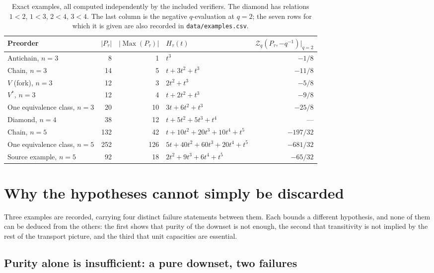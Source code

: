 \documentclass[11pt]{article}
\numberwithin{equation}{section}
\theoremstyle{definition}
\theoremstyle{remark}
\newcommand{\Max}{\operatorname{Max}}
\newcommand{\Zeta}{\mathcal Z}
\begin{document}
\begin{table}[htbp]
\centering
\small
\begin{tabular}{@{}lrrlr@{}}
\toprule
Preorder & $|P_\tau|$ & $|\Max(P_\tau)|$ & $H_\tau(t)$
 & $\Zeta_q(P_\tau,-q^{-1})|_{q=2}$\\
\midrule
Antichain, $n=3$ & 8 & 1 & $t^3$ & $-1/8$\\
Chain, $n=3$ & 14 & 5 & $t+3t^2+t^3$ & $-11/8$\\
$V$ (fork), $n=3$ & 12 & 3 & $2t^2+t^3$ & $-5/8$\\
$V^*$, $n=3$ & 12 & 4 & $t+2t^2+t^3$ & $-9/8$\\
One equivalence class, $n=3$ & 20 & 10 & $3t+6t^2+t^3$ & $-25/8$\\
Diamond, $n=4$ & 38 & 12 & $t+5t^2+5t^3+t^4$ & ---\\
Chain, $n=5$ & 132 & 42 & $t+10t^2+20t^3+10t^4+t^5$ & $-197/32$\\
One equivalence class, $n=5$ & 252 & 126 & $5t+40t^2+60t^3+20t^4+t^5$
 & $-681/32$\\
Source example, $n=5$ & 92 & 18 & $2t^2+9t^3+6t^4+t^5$ & $-65/32$\\
\bottomrule
\end{tabular}
\caption{Exact examples, all computed independently by the included
verifiers. The diamond has relations $1<2$, $1<3$, $2<4$, $3<4$. The last
column is the negative $q$-evaluation at $q=2$; the seven rows for which it is
given are also recorded in \texttt{data/examples.csv}.}
\label{tab:examples}
\end{table}

\section{Why the hypotheses cannot simply be discarded}
\label{sec:limits}

Three examples are recorded, carrying four distinct failure statements
between them. Each bounds a different hypothesis, and none of them can be
deduced from the others: the first shows that purity of the downset is not
enough, the second that transitivity is not implied by the rest of the
transport picture, and the third that unit capacities are essential.

\subsection{Purity alone is insufficient: a pure downset, two failures}
\label{sec:pure-downset}
\end{document}
